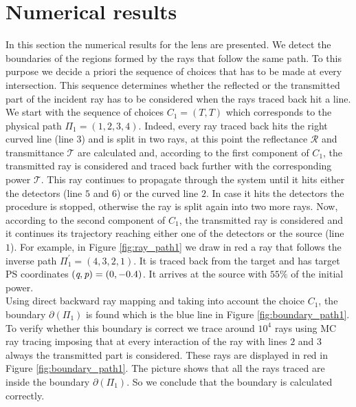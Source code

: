 \section{Numerical results}
In this section the numerical results for the lens are presented. We detect the boundaries of the regions formed by the rays that follow the same path. To this purpose we decide a priori the sequence of choices that has to be made at every intersection. This sequence determines whether the reflected or the transmitted part of the incident ray has to be considered when the rays traced back hit a line.\\ \indent
We start with the sequence of choices $C_1 = (T,T)$ which corresponds to the physical path $\Pi_1=(1,2,3,4)$.
Indeed, every ray traced back hits the right curved line (line $3$) and is split in two rays, at this point the reflectance $\mathcal{R}$ and transmittance $\mathcal{T}$ are calculated and, according to the first component of $C_1$, the transmitted ray is considered and traced back further with the corresponding power $\mathcal{T}$. This ray continues to propagate through the system until it hits either the detectors (line $5$ and $6$) or the curved line $2$.
In case it hits the detectors the procedure is stopped, otherwise the ray is split again into two more rays. Now, according to the second component of $C_1$, the transmitted ray is considered and it continues its trajectory reaching either one of the detectors or the source (line $1$). For example, in Figure \ref{fig:ray_path1} we draw in red a ray that follows the inverse path $\Pi_1^{\prime} = (4,3,2,1)$. It is traced back from the target and has target PS coordinates $(\textit{q}, \textit{p})=(0, -0.4)$. It arrives at the source with $55\%$ of the initial power.\\ \indent 
Using direct backward ray mapping and taking into account the choice $C_1$, the boundary $\partial$$(\Pi_1)$ is found which is the blue line in Figure \ref{fig:boundary_path1}. To verify whether this boundary is correct we trace around $10^4$ rays using MC ray tracing imposing that at every interaction of the ray with lines $2$ and $3$ always the transmitted part is considered. These rays are displayed in red in Figure \ref{fig:boundary_path1}. The picture shows that all the rays traced are inside the boundary $\partial$$(\Pi_1)$. So we conclude that the boundary is calculated correctly.
